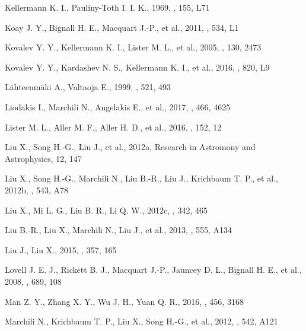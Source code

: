 \documentclass[a4paper,fleqn,usenatbib]{mnras}
\begin{document}
\begin{thebibliography}{99}
Kellermann K. I., Pauliny-Toth I. I. K., 1969, \apj, 155, L71

Koay J. Y., Bignall H. E., Macquart J.-P., et al., 2011, \aap, 534, L1

Kovalev Y. Y., Kellermann K. I., Lister M. L., et al., 2005, \aj, 130, 2473

Kovalev Y. Y., Kardashev N. S., Kellermann K. I., et al., 2016, \apj, 820, L9

L\"ahteenm\"aki A., Valtaoja E., 1999, \apj, 521, 493

Liodakis I., Marchili N., Angelakis E., et al., 2017, \mnras, 466, 4625

Lister M. L., Aller M. F., Aller H. D., et al., 2016, \aj, 152, 12

Liu X., Song H.-G., Liu J., et al., 2012a, Research in Astromony and Astrophysics, 12, 147

Liu X., Song H.-G., Marchili N., Liu B.-R., Liu J., Krichbaum T. P., et al., 2012b, \aap, 543, A78

Liu X., Mi L. G., Liu B. R., Li Q. W., 2012c, \apss, 342, 465

Liu B.-R., Liu X., Marchili N., Liu J., et al., 2013, \aap, 555, A134

Liu J., Liu X., 2015, \apss, 357, 165

Lovell J. E. J., Rickett B. J., Macquart J.-P., Jauncey D. L., Bignall H. E., et al., 2008, \apj, 689, 108

Man Z. Y., Zhang X. Y., Wu J. H., Yuan Q. R., 2016, \mnras, 456, 3168

Marchili N., Krichbaum T. P., Liu X., Song H.-G., et al., 2012, \aap, 542, A121


\end{thebibliography}
\end{document}

